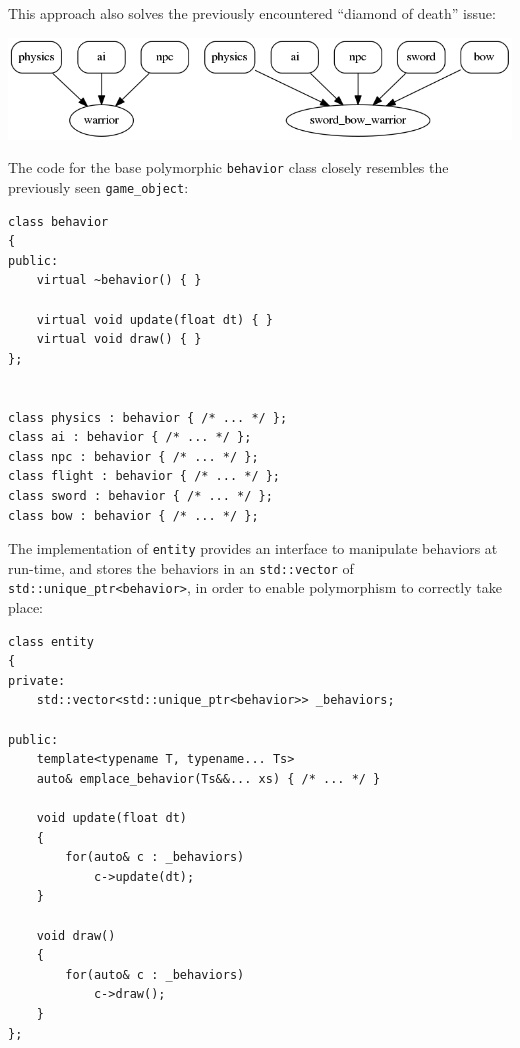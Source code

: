 \documentclass[twoside, 12pt, a4paper, openany]{book}
\let\origfigure=\figure
\let\endorigfigure=\endfigure
\renewenvironment{figure}[1][]{%
\origfigure[H]
}{%
\endorigfigure
}
\begin{document}
This approach also solves the previously encountered ``diamond of
death'' issue:

\begin{figure}[htbp]
\centering
\includegraphics{source/figures/generated/ecs/overview/oop_composition/example_rpg_1.png}
\caption{Object-oriented composition: RPG - unarmed and sword+bow
warrior}
\end{figure}

The code for the base polymorphic
\texttt{behavior}
class closely resembles the previously seen
\texttt{game_object}:

\begin{verbatim}
class behavior
{
public:
    virtual ~behavior() { }

    virtual void update(float dt) { }
    virtual void draw() { }
};


class physics : behavior { /* ... */ };
class ai : behavior { /* ... */ };
class npc : behavior { /* ... */ };
class flight : behavior { /* ... */ };
class sword : behavior { /* ... */ };
class bow : behavior { /* ... */ };
\end{verbatim}

The implementation of
\texttt{entity}
provides an interface to manipulate behaviors at run-time, and stores
the behaviors in an
\texttt{std::vector}
of
\texttt{std::unique_ptr<behavior>},
in order to enable polymorphism to correctly take place:

\begin{verbatim}
class entity
{
private:
    std::vector<std::unique_ptr<behavior>> _behaviors;

public:
    template<typename T, typename... Ts>
    auto& emplace_behavior(Ts&&... xs) { /* ... */ }

    void update(float dt)
    {
        for(auto& c : _behaviors)
            c->update(dt);
    }

    void draw()
    {
        for(auto& c : _behaviors)
            c->draw();
    }
};
\end{verbatim}
\end{document}
